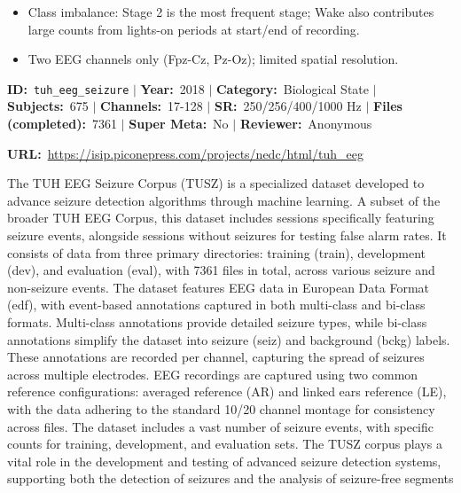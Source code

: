 {\begin{tcolorbox}
\begin{itemize}[leftmargin=1.4em,noitemsep,topsep=2pt]
\item{\footnotesize Class imbalance: Stage 2 is the most frequent stage; Wake also contributes large counts from lights-on periods at start/end of recording.}
\item{\footnotesize Two EEG channels only (Fpz-Cz, Pz-Oz); limited spatial resolution.}
\end{itemize}
\end{tcolorbox}
\vspace{3pt}
\noindent\begin{tcolorbox}[breakable,enhanced,colback=white,colframe=gray!55,boxrule=0.9pt,arc=4pt,left=6pt,right=6pt,top=4pt,bottom=4pt,title={\small\bfseries TUH EEG Seizure Corpus\hfill \colorbox{gray!20}{\scriptsize\sffamily\bfseries Completed}},coltitle=black,colbacktitle=gray!12,titlerule=0.5pt]
{\footnotesize \textbf{ID:}~\texttt{tuh\_eeg\_seizure} $\mid$ \textbf{Year:}~2018 $\mid$ \textbf{Category:}~Biological State $\mid$ \textbf{Subjects:}~675 $\mid$ \textbf{Channels:}~17-128 $\mid$ \textbf{SR:}~250/256/400/1000 Hz $\mid$ \textbf{Files (completed):}~7361 $\mid$ \textbf{Super Meta:}~No $\mid$ \textbf{Reviewer:}~Anonymous}
\par{\footnotesize\textbf{URL:}~\url{https://isip.piconepress.com/projects/nedc/html/tuh_eeg}}
\tcbline
{}\par\smallskip
{\footnotesize The TUH EEG Seizure Corpus (TUSZ) is a specialized dataset developed to advance seizure detection algorithms through machine learning. A subset of the broader TUH EEG Corpus, this dataset includes sessions specifically featuring seizure events, alongside sessions without seizures for testing false alarm rates. It consists of data from three primary directories: training (train), development (dev), and evaluation (eval), with 7361 files in total, across various seizure and non-seizure events. The dataset features EEG data in European Data Format (edf), with event-based annotations captured in both multi-class and bi-class formats. Multi-class annotations provide detailed seizure types, while bi-class annotations simplify the dataset into seizure (seiz) and background (bckg) labels. These annotations are recorded per channel, capturing the spread of seizures across multiple electrodes. EEG recordings are captured using two common reference configurations: averaged reference (AR) and linked ears reference (LE), with the data adhering to the standard 10/20 channel montage for consistency across files. The dataset includes a vast number of seizure events, with specific counts for training, development, and evaluation sets. The TUSZ corpus plays a vital role in the development and testing of advanced seizure detection systems, supporting both the detection of seizures and the analysis of seizure-free segments}

\end{tcolorbox}}
